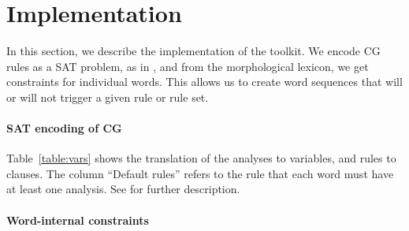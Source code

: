 \section{Implementation}
\label{sec:implementation}

In this section, we describe the implementation of the toolkit.
We encode CG rules as a SAT problem, as in \cite{listenmaa_claessen2015}, and from the morphological lexicon, we get constraints for individual words. This allows us to create word sequences that will or will not trigger a given rule or rule set.


\paragraph{SAT encoding of CG}

Table~\ref{table:vars} shows the translation of the analyses to variables, and rules to clauses. The column ``Default rules'' refers to the rule that each word must have at least one analysis.
See \cite{listenmaa_claessen2015} for further description.




\paragraph{Word-internal constraints}

